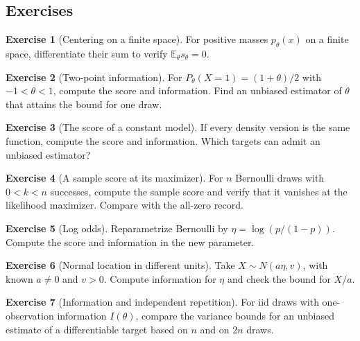 \documentclass[11pt,oneside]{book}
\theoremstyle{definition}
\newtheorem{exercise}{Exercise}[section]
\theoremstyle{remark}
\begin{document}
\subsection{Exercises}
\label{subsec:exercises-5-4}

\begin{exercise}[Centering on a finite space]
\label{exer:fisher-finite-centering}
For positive masses $p_\theta(x)$ on a finite space, differentiate
their sum to verify $\mathbb E_\theta s_\theta=0$.
\end{exercise}

\begin{exercise}[Two-point information]
\label{exer:fisher-binary-linear-probability}
For $P_\theta(X=1)=(1+\theta)/2$ with $-1<\theta<1$,
compute the score and information. Find an unbiased estimator
of $\theta$ that attains the bound for one draw.
\end{exercise}

\begin{exercise}[The score of a constant model]
\label{exer:fisher-constant-model}
If every density version is the same function, compute the score
and information. Which targets can admit an unbiased estimator?
\end{exercise}

\begin{exercise}[A sample score at its maximizer]
\label{exer:fisher-score-bernoulli-mle}
For $n$ Bernoulli draws with $0<k<n$ successes, compute the
sample score and verify that it vanishes at the likelihood
maximizer. Compare with the all-zero record.
\end{exercise}

\begin{exercise}[Log odds]
\label{exer:fisher-bernoulli-log-odds}
Reparametrize Bernoulli by $\eta=\log(p/(1-p))$. Compute the
score and information in the new parameter.
\end{exercise}

\begin{exercise}[Normal location in different units]
\label{exer:fisher-normal-location-units}
Take $X\sim N(a\eta,v)$, with known $a\ne0$ and $v>0$.
Compute information for $\eta$ and check the bound for $X/a$.
\end{exercise}

\begin{exercise}[Information and independent repetition]
\label{exer:fisher-independent-repetition}
For iid draws with one-observation information $I(\theta)$,
compare the variance bounds for an unbiased estimate of a
differentiable target based on $n$ and on $2n$ draws.
\end{exercise}
\end{document}
